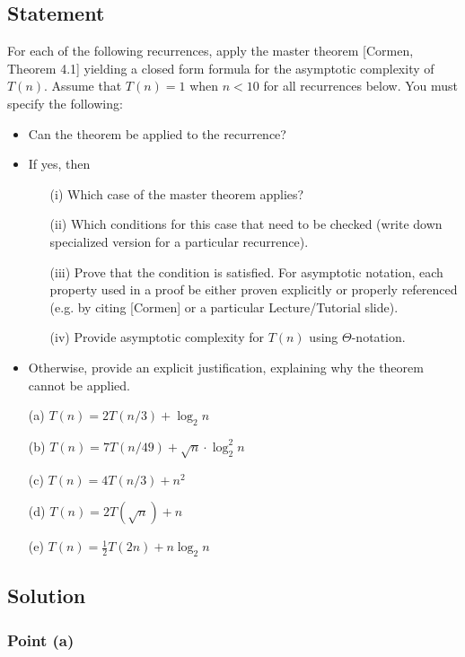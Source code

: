 \documentclass{article}
\begin{document}
\subsection{Statement}
For each of the following recurrences, apply the master theorem [Cormen, Theorem 4.1] yielding a closed form formula for the asymptotic complexity of $T(n)$. Assume that $T(n) = 1$ when $n < 10$ for all recurrences below. You must specify the following:
\begin{itemize}
    \setlength\itemsep{0em}
    \item Can the theorem be applied to the recurrence?
    \item If yes, then
    \begin{enumerate}
        \setlength\itemsep{0em}
        \item [(i)] Which case of the master theorem applies?
        \item [(ii)] Which conditions for this case that need to be checked (write down specialized version for a particular recurrence).
        \item [(iii)] Prove that the condition is satisfied. For asymptotic notation, each property used in a proof  be either proven explicitly or properly referenced (e.g. by citing [Cormen] or a particular Lecture/Tutorial slide).
        \item [(iv)] Provide asymptotic complexity for $T(n)$ using $\Theta$-notation.
    \end{enumerate}
    \item Otherwise, provide an explicit justification, explaining why the theorem cannot be applied.
\end{itemize}
\begin{itemize}
    \setlength\itemsep{0em}
    \item [(a)] $T(n) = 2T(n/3) + \log_2n$
    \item [(b)] $T(n) = 7T(n/49) + \sqrt{n}\cdot\log_2^2 n$
    \item [(c)] $T(n) = 4T(n/3) + n^2$
    \item [(d)] $T(n) = 2T(\sqrt{n}) + n$
    \item [(e)] $T(n) = \frac{1}{2}T(2n) + n\log_2 n$
\end{itemize}

\subsection{Solution}
\subsubsection{Point (a)}
\end{document}
